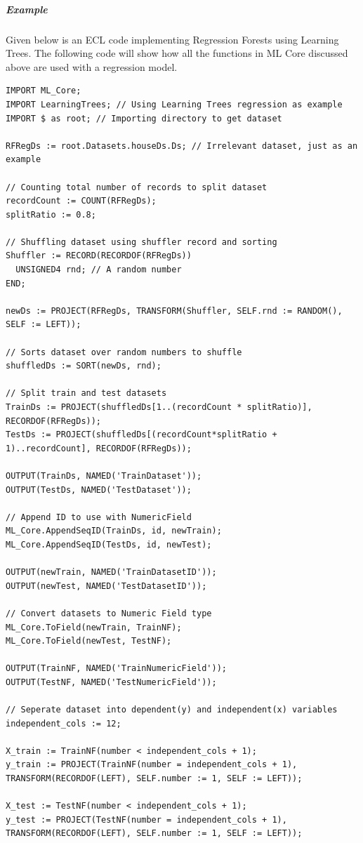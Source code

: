 \subparagraph{Example}\label{regression:example}

Given below is an ECL code implementing Regression Forests using Learning Trees. The following code will show how all the functions in ML Core discussed above are used with a regression model.

\begin{lstlisting}
IMPORT ML_Core;
IMPORT LearningTrees; // Using Learning Trees regression as example
IMPORT $ as root; // Importing directory to get dataset

RFRegDs := root.Datasets.houseDs.Ds; // Irrelevant dataset, just as an example

// Counting total number of records to split dataset
recordCount := COUNT(RFRegDs);
splitRatio := 0.8;

// Shuffling dataset using shuffler record and sorting
Shuffler := RECORD(RECORDOF(RFRegDs))
  UNSIGNED4 rnd; // A random number
END;

newDs := PROJECT(RFRegDs, TRANSFORM(Shuffler, SELF.rnd := RANDOM(), SELF := LEFT));

// Sorts dataset over random numbers to shuffle
shuffledDs := SORT(newDs, rnd);

// Split train and test datasets
TrainDs := PROJECT(shuffledDs[1..(recordCount * splitRatio)], RECORDOF(RFRegDs));
TestDs := PROJECT(shuffledDs[(recordCount*splitRatio + 1)..recordCount], RECORDOF(RFRegDs));

OUTPUT(TrainDs, NAMED('TrainDataset'));
OUTPUT(TestDs, NAMED('TestDataset'));

// Append ID to use with NumericField 
ML_Core.AppendSeqID(TrainDs, id, newTrain);
ML_Core.AppendSeqID(TestDs, id, newTest);

OUTPUT(newTrain, NAMED('TrainDatasetID'));
OUTPUT(newTest, NAMED('TestDatasetID'));

// Convert datasets to Numeric Field type
ML_Core.ToField(newTrain, TrainNF);
ML_Core.ToField(newTest, TestNF);

OUTPUT(TrainNF, NAMED('TrainNumericField'));
OUTPUT(TestNF, NAMED('TestNumericField'));

// Seperate dataset into dependent(y) and independent(x) variables
independent_cols := 12;

X_train := TrainNF(number < independent_cols + 1);
y_train := PROJECT(TrainNF(number = independent_cols + 1), TRANSFORM(RECORDOF(LEFT), SELF.number := 1, SELF := LEFT));

X_test := TestNF(number < independent_cols + 1);
y_test := PROJECT(TestNF(number = independent_cols + 1), TRANSFORM(RECORDOF(LEFT), SELF.number := 1, SELF := LEFT));


\end{lstlisting}
